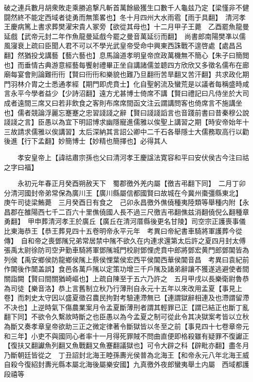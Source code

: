 破之連兵數月胡衆敗走乘勝追撃凡斬首萬餘級獲生口數千人龜兹乃定【梁慬非不健闘然終不能定西域者徒勇而無策畧也】冬十月四州大水雨雹【雨于具翻】　清河孝王慶病篤上書求葬樊濯宋貴人冢旁【欲從其母也】十二月甲子王薨　乙酉罷魚龍曼延戲【武帝元封二年作魚龍曼延戲今罷之曼音萬延衍而翻】　尚書郎南陽樊凖以儒風寖衰上疏曰臣聞人君不可以不學光武皇帝受命中興東西誅戰不遑啓處【處昌呂翻】然猶投戈講藝【藝六藝也】息馬論道孝明皇帝庶政萬機無不簡心【朱子曰簡閲也】而垂情古典游意經藝每饗射禮畢正坐自講諸儒並聼四方欣欣又多徵名儒布在廊廟每宴會則論難衎衎【賢曰衎衎和樂貌也難乃旦翻衎苦旱翻又苦汗翻】共求政化期門羽林介胄之士悉通孝經【期門即虎賁士】化自聖躬流及蠻荒是以議者每稱盛時咸言永平今學者益少【少詩沼翻】遠方尤甚博士倚席不講【賢曰禮記曰凡侍坐於大司成者遠間三席又曰若非飲食之客則布席席間函文注云謂講問客也倚席言不施講坐也】儒者競論浮麗忘蹇蹇之忠習諓諓之辭【賢曰諓諓謟言也音踐前書曰昔秦穆公說諓諓之言】臣愚以為宜下明詔博求幽隱寵進儒雅以俟聖上講習之期【時安帝始年十三故請求儒雅以俟講習】太后深納其言詔公卿中二千石各舉隱士大儒務取高行以勸後進【行下孟翻】妙簡博士【妙精也簡擇也】必得其人

　　孝安皇帝上【諱祜肅宗孫也父曰清河孝王慶諡法寛容和平曰安伏侯古今注曰祜之字曰福】

　　永初元年春正月癸酉朔赦天下　蜀郡徼外羌内屬【徼吉弔翻下同】　二月丁卯分清河國封帝弟常保為廣川王【廣川縣屬信都國賢曰故城在今冀州棗彊縣東北】　庚午司徒梁鮪薨　三月癸酉日有食之　己卯永昌徼外僬僥種夷陸類等舉種内附【永昌郡在雒陽西七千二百六十里僬僥國人長不過三尺徼吉弔翻僬兹消翻僥倪么翻種章勇翻】　甲申葬清河孝王於廣丘【廣丘在清河厝縣後更名甘陵】司空宗正護喪事儀比東海恭王【恭王葬見四十五卷明帝永平元年　考異曰帝紀書車騎將軍護葬今從傳】　自和帝之喪鄧隲兄弟常居禁中隲不欲久在内連求還第太后許之夏四月封太傅張禹太尉徐防司空尹勤車騎將軍鄧隲城門校尉鄧悝虎賁中郎將鄧宏黄門郎鄧閶皆為列侯【禹安鄉侯防龍鄉侯隲上蔡侯悝葉侯宏西平侯閶西華侯閶音昌　考異曰袁紀前作閶後作闓盖誤】食邑各萬戶隲以定策功增三千戶隲及諸弟辭讓不獲遂逃避使者間關詣闕【賢曰間關猶崎嶇也】上疏自陳至于五六乃許之　五月甲戌以長樂衛尉魯恭為司徒【樂音洛】恭上言舊制立秋乃行薄刑自永元十五年以來改用孟夏【事見上卷】而刺史太守因以盛夏徵召農民拘對考驗連滯無已【連謂獄辭相連及也滯謂留滯不决也】上逆時氣下傷農業案月令孟夏斷薄刑者謂其輕罪已正【謂已結正也斷丁亂翻下同】不欲令久繫故時斷之也臣愚以為今孟夏之制可從此令其决獄案考皆以立秋為斷又奏孝章皇帝欲助三正之微定律著令斷獄皆以冬至之前【事見四十七卷章帝元和三年】小吏不與國同心者率十一月得死罪賊不問曲直便即格殺雖有疑罪不復讞正【復扶又翻讞魚列翻又魚戰翻又魚蹇翻議獄也】可令大辟之科【辟毗亦翻】盡冬月乃斷朝廷皆從之　丁丑詔封北海王睦孫夀光侯普為北海王【和帝永元八年北海王威自殺今復紹封夀光縣本屬北海後屬樂安國】九真徼外夜郎蠻夷舉土内屬　西域都護段禧等

